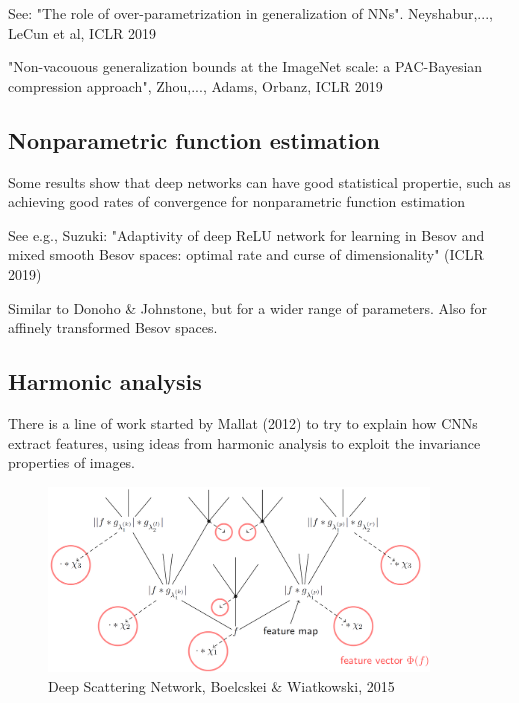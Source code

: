 \documentclass[english]{article}
\begin{document}
\item See: "The role of over-parametrization in generalization of NNs". Neyshabur,..., LeCun et al, ICLR 2019

"Non-vacouous generalization bounds at the ImageNet scale: a PAC-Bayesian compression approach", Zhou,..., Adams, Orbanz, ICLR 2019
\eenum



\subsection{Nonparametric function estimation}


\benum
\item Some results show that deep networks can have good statistical propertie, such as achieving good rates of convergence for nonparametric function estimation

See e.g., Suzuki: "Adaptivity of deep ReLU network for learning in Besov and mixed smooth Besov spaces: optimal rate and curse of dimensionality" (ICLR 2019)

Similar to Donoho \& Johnstone, but for a wider range of parameters. Also for affinely transformed Besov spaces.

\eenum 

\subsection{Harmonic analysis}

There is a line of work started by Mallat (2012) to try to explain how CNNs extract features, using ideas from harmonic analysis to exploit the invariance properties of images. 

\begin{figure}
  \centering
  \includegraphics[width=0.9\textwidth]{s.png}
  \caption{Deep Scattering Network, Boelcskei \& Wiatkowski, 2015}
  \label{dsn}
\end{figure}
\end{document}
